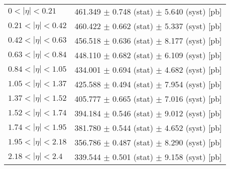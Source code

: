 \begin{tabular}{lc}
\hline
\hline
$0 < |\eta| <0.21$             & 461.349 $\pm$ 0.748 (stat) $\pm$ 5.640 (syst) [pb]  \\
$0.21 < |\eta| <0.42$          & 460.422 $\pm$ 0.662 (stat) $\pm$ 5.337 (syst) [pb]  \\
$0.42 < |\eta| <0.63$          & 456.518 $\pm$ 0.636 (stat) $\pm$ 8.177 (syst) [pb]  \\
$0.63 < |\eta| <0.84$          & 448.110 $\pm$ 0.682 (stat) $\pm$ 6.109 (syst) [pb]  \\
$0.84 < |\eta| <1.05$          & 434.001 $\pm$ 0.694 (stat) $\pm$ 4.682 (syst) [pb]  \\
$1.05 < |\eta| <1.37$          & 425.588 $\pm$ 0.494 (stat) $\pm$ 7.954 (syst) [pb]  \\
$1.37 < |\eta| <1.52$          & 405.777 $\pm$ 0.665 (stat) $\pm$ 7.016 (syst) [pb]  \\
$1.52 < |\eta| <1.74$          & 394.184 $\pm$ 0.546 (stat) $\pm$ 9.012 (syst) [pb]  \\
$1.74 < |\eta| <1.95$          & 381.780 $\pm$ 0.544 (stat) $\pm$ 4.652 (syst) [pb]  \\
$1.95 < |\eta| <2.18$          & 356.786 $\pm$ 0.487 (stat) $\pm$ 8.290 (syst) [pb]  \\
$2.18 < |\eta| <2.4$           & 339.544 $\pm$ 0.501 (stat) $\pm$ 9.158 (syst) [pb]  \\
\hline
\hline
\end{tabular}
